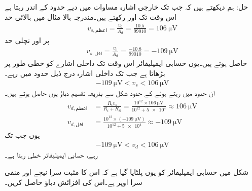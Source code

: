 حل: ہم دیکھتے ہیں کہ جب تک خارجی اشارہ مساوات  میں دیے حدود کے اندر رہتا ہے اس وقت تک  اور    رکھتے ہیں۔مندرجہ بالا مثال میں بالائی حد
\begin{align*}
v_{s,\text{اعظم}}= \frac{v_0}{A_d}=\frac{10.5}{99010}=\SI{106}{\micro\volt}
\end{align*}
پر اور نچلی حد
\begin{align*}
v_{s,\text{اقل}}= \frac{v_0}{A_d}=\frac{-10.8}{99010}=\SI{-109}{\micro\volt}
\end{align*}
حاصل ہوتے ہیں۔یوں حسابی ایمپلیفائر اس وقت تک داخلی اشارے کو خطی طور پر بڑھاتا ہے جب تک داخلی اشارہ درج ذیل حدود میں رہے۔
\begin{align*}
\SI{-109}{\micro\volt} < v_s < \SI{106}{\micro\volt} 
\end{align*} 
ان حدود میں رہتے ہوئے  کے حدود شکل  سے بذریعہ تقسیم دباؤ یوں حاصل ہوتے ہیں۔
\begin{align*}
v_{d,\text{اعظم}}&=\frac{R_i v_s}{R_i+R_S}=\frac{10^{12} \times \SI{106}{\micro\volt}}{10^{12}+\num{5e4}} \approx \SI{106}{\micro\volt}\\
v_{d,\text{اقل}}&=\frac{10^{12} \times (\SI{-109}{\micro\volt})}{10^{12}+\num{5e4}} \approx \SI{-109}{\micro\volt}
\end{align*}
یوں جب تک 
\begin{align}\label{مساوات_حسابی_خطی_حدود_داخلی_اشارہ}
\SI{-109}{\micro\volt} < v_d < \SI{106}{\micro\volt}
\end{align} 
رہے، حسابی ایمپلیفائر خطی رہتا ہے۔ 

شکل  میں حسابی ایمپلیفائر کو یوں پلٹایا گیا ہے کہ اس کا مثبت سرا نیچے اور منفی سرا اوپر ہے۔اس کی افزائش دباؤ  حاصل کریں۔

